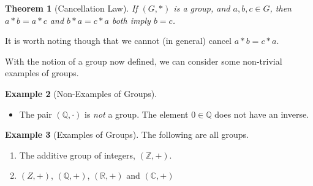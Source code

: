 \documentclass[11pt, a4paper]{article}
\newtheorem{theorem}{Theorem}[section]
\newtheorem{proposition}[theorem]{Proposition}
\theoremstyle{definition}
\newtheorem{example}[theorem]{Example}
\begin{document}
%

\begin{theorem}[Cancellation Law]
	If $(G, *)$ is a group, and $a, b, c \in G$, then $a*b = a*c$ and $b*a = c*a$ both imply $b = c$.
\end{theorem}


It is worth noting though that we cannot (in general) cancel $a * b = c * a$.

With the notion of a group now defined, we can consider some non-trivial examples of groups.

\begin{example}[Non-Examples of Groups]$ $
	\begin{itemize}
		\item The pair $(\mathbb{Q}, \cdot)$ is \emph{not} a group. The element $0 \in \mathbb{Q}$ does not have an inverse.
	\end{itemize}
\end{example}

\begin{example}[Examples of Groups]
	The following are all groups.
	\begin{enumerate}
		\item The additive group of integers, $(\mathbb{Z}, +)$.
		\item $(Z, +)$, $(\mathbb{Q}, +)$, $(\mathbb{R}, +)$ and $(\mathbb{C}, +)$
	\end{enumerate}
\end{example}
\end{document}
